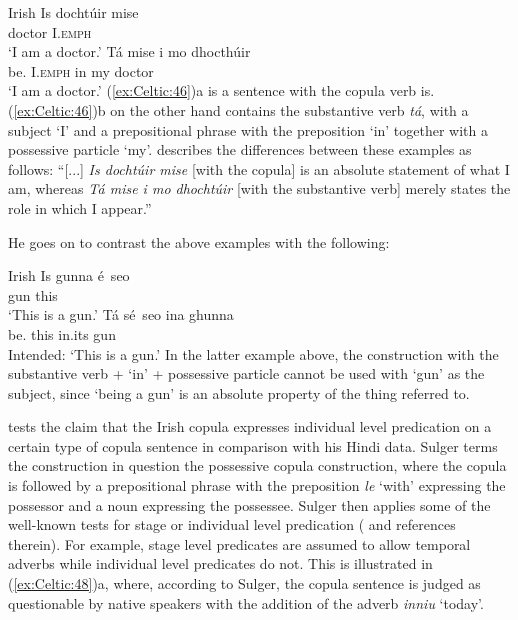 \documentclass[output=paper,colorlinks,citecolor=brown]{langscibook}
\begin{document}
\ea\label{ex:Celtic:46} Irish \citep[136]{MacEoin2002}
\ea
\gll Is dochtúir mise\\
{\COP} doctor  I.\textsc{emph}\\
\glt`I am a doctor.'
\ex
\gll Tá mise  i mo dhocthúir\\
{be.\PRS} I.\textsc{emph} in my doctor\\
\glt`I am a doctor.'
\z\z
(\ref{ex:Celtic:46})a is a sentence with the copula verb is. (\ref{ex:Celtic:46})b on the other hand contains the substantive verb \emph{tá}, with a subject `I' and a prepositional phrase with the preposition `in' together with a possessive particle `my'. \citet[136]{MacEoin2002} describes the differences between these examples as follows: ``[...] \emph{Is dochtúir mise} [with the copula] is an absolute statement of what I am, whereas \emph{Tá mise i mo dhochtúir} [with the substantive verb] merely states the role in which I appear.''

He goes on to contrast the above examples with the following:

\ea\label{ex:Celtic:47} Irish \citep[137]{MacEoin2002}
\ea
\gll Is gunna \'e~seo\\
{\COP} gun this\\
\glt`This is a gun.'
\ex
\gll *Tá s\'e~seo ina ghunna\\
  {be.\PRS} this in.its gun\\
\glt Intended: `This is a gun.'
\z\z
In the latter example above, the construction with the substantive verb + `in' + possessive particle cannot be used with `gun' as the subject, since `being a gun' is an absolute property of the thing referred to.

\citet{Sulger2011} tests the claim that the Irish copula expresses individual level predication on a certain type of copula sentence in comparison with his Hindi data. Sulger terms the construction in question the possessive copula construction, where the copula is followed by a prepositional phrase with the preposition \emph{le} `with' expressing the possessor and a noun expressing the possessee. Sulger then applies some of the well-known tests for stage or individual level predication (\citealt[7]{Sulger2011} and references therein). For example, stage level predicates are assumed to allow temporal adverbs while individual level predicates do not. This is illustrated in (\ref{ex:Celtic:48})a, where, according to Sulger, the copula sentence is judged as questionable by native speakers with the addition of the adverb \emph{inniu} `today'.
\end{document}
